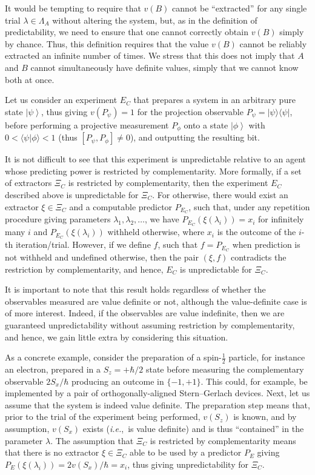 \documentclass[information,article,accept,moreauthors,pdftex,12pt,a4paper]{mdpi}
\theoremstyle{mdpi}
\newcounter{ex}
\newcounter{re}
\theoremstyle{mdpidefinition}
\newcommand{\ket}[1]{\left| #1 \right>}
\newcommand{\iprod}[2]{\langle #1 | #2 \rangle}
\newcommand{\oprod}[2]{| #1 \rangle\langle #2 |}
\begin{document}
It would be tempting to require that $v(B)$ cannot be ``extracted'' for any single trial $\lambda\in\Lambda_A$ without altering the system, but, as in the definition of predictability, we need to ensure that one cannot correctly obtain $v(B)$ simply by chance.
Thus, this definition requires that the value $v(B)$ cannot be reliably extracted an infinite number of times.
We stress that this does not imply that $A$ and $B$ cannot simultaneously have definite values, simply that we cannot {know} both at once.



Let us consider an experiment $E_C$ that prepares a system in an arbitrary pure state $\ket{\psi}$, thus giving $v(P_\psi)=1$ for the projection observable $P_\psi=\oprod{\psi}{\psi}$, before performing a projective measurement $P_\phi$ onto a state $\ket{\phi}$ with $0 < \iprod{\psi}{\phi} < 1$ (thus $[P_\psi,P_\phi]\neq 0$), and outputting the resulting bit.


It is not difficult to see that this experiment is unpredictable relative to an agent whose predicting power is restricted by complementarity.
More formally, if a set of extractors $\Xi_C$ is restricted by complementarity, then the experiment $E_C$ described above is unpredictable for $\Xi_C$.
For otherwise, there would exist an extractor $\xi\in\Xi_C$ and a computable predictor $P_{E_C}$, such that, under any repetition procedure giving parameters $\lambda_1,\lambda_2,\dots$, we have $P_{E_C}(\xi(\lambda_i))=x_i$ for infinitely many $i$ and $P_{E_C}(\xi(\lambda_i))$ withheld otherwise, where $x_i$ is the outcome of the $i$-th iteration/trial.
However, if we define $f$, such that $f=P_{E_C}$ when prediction is not withheld and undefined otherwise, then the pair $(\xi,f)$ contradicts the restriction by complementarity, and hence, $E_C$ is unpredictable for $\Xi_C$.

It is important to note that this result holds regardless of whether the observables measured are value definite or not, although the value-definite case is of more interest.
Indeed, if the observables are value indefinite, then we are guaranteed unpredictability without assuming restriction by complementarity, and hence, we gain little extra by considering this situation.


As a concrete example, consider the preparation of a spin-$\frac{1}{2}$ particle, for instance an electron, prepared in a $S_z=+\hbar/2$ state before measuring the complementary observable $2S_x/\hbar$ producing an outcome in $\{-1,+1\}.$
This could, for example, be implemented by a pair of orthogonally-aligned Stern--Gerlach devices.
Next, let us assume that the system is indeed value definite.
The preparation step means that, prior to the trial of the experiment being performed, $v(S_z)$ is known, and by assumption, $v(S_x)$ exists (\emph{i.e.},\ is value definite) and is thus ``contained'' in the parameter $\lambda$.
The assumption that $\Xi_C$ is restricted by complementarity means that there is no extractor $\xi\in\Xi_C$ able to be used by a predictor $P_E$ giving $P_E(\xi(\lambda_i))=2v(S_x)/\hbar=x_i$, thus giving unpredictability for $\Xi_C$.
\end{document}
